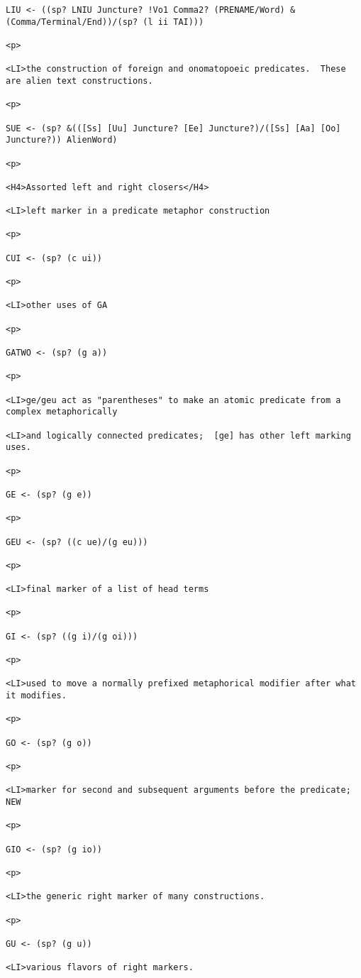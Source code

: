\documentclass[12pt]{article}
\begin{document}
\begin{lstlisting}
LIU <- ((sp? LNIU Juncture? !Vo1 Comma2? (PRENAME/Word) &(Comma/Terminal/End))/(sp? (l ii TAI)))

<p>

<LI>the construction of foreign and onomatopoeic predicates.  These are alien text constructions.

<p>

SUE <- (sp? &(([Ss] [Uu] Juncture? [Ee] Juncture?)/([Ss] [Aa] [Oo] Juncture?)) AlienWord)

<p>

<H4>Assorted left and right closers</H4>

<LI>left marker in a predicate metaphor construction

<p>

CUI <- (sp? (c ui))

<p>

<LI>other uses of GA

<p>

GATWO <- (sp? (g a))

<p>

<LI>ge/geu act as "parentheses" to make an atomic predicate from a complex metaphorically

<LI>and logically connected predicates;  [ge] has other left marking uses.

<p>

GE <- (sp? (g e))

<p>

GEU <- (sp? ((c ue)/(g eu)))

<p>

<LI>final marker of a list of head terms

<p>

GI <- (sp? ((g i)/(g oi)))

<p>

<LI>used to move a normally prefixed metaphorical modifier after what it modifies.

<p>

GO <- (sp? (g o))

<p>

<LI>marker for second and subsequent arguments before the predicate; NEW

<p>

GIO <- (sp? (g io))

<p>

<LI>the generic right marker of many constructions.

<p>

GU <- (sp? (g u))

<LI>various flavors of right markers.


\end{lstlisting}
\end{document}
